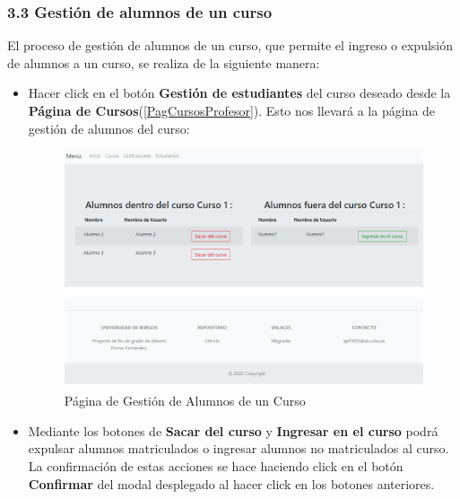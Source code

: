 \subsubsection{3.3 Gestión de alumnos de un curso}
El proceso de gestión de alumnos de un curso, que permite el ingreso o expulsión de alumnos a un curso, se realiza de la siguiente manera:
\begin{itemize}
\tightlist
\item Hacer click en el botón \textbf{Gestión de estudiantes} del curso deseado desde la \textbf{Página de Cursos}(\ref{PagCursosProfesor}). Esto nos llevará a la página de gestión de alumnos del curso:
\begin{figure}[H]
\centering
\includegraphics[width=\textwidth]{img/imgs-memoria/GestionAluCurso.PNG}
\caption{Página de Gestión de Alumnos de un Curso}
\end{figure}
\item Mediante los botones de \textbf{Sacar del curso} y \textbf{Ingresar en el curso} podrá expulsar alumnos matriculados o ingresar alumnos no matriculados al curso. La confirmación de estas acciones se hace haciendo click en el botón \textbf{Confirmar} del modal desplegado al hacer click en los botones anteriores.
\end{itemize}


